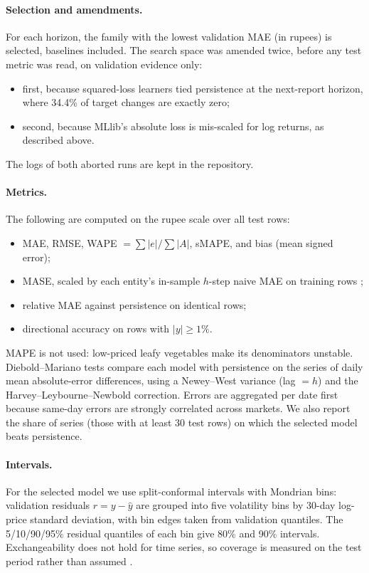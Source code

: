 \paragraph{Selection and amendments.}
For each horizon, the family with the lowest validation MAE (in rupees) is selected, baselines included.
The search space was amended twice, before any test metric was read, on validation evidence only:
\begin{itemize}
  \item first, because squared-loss learners tied persistence at the next-report horizon, where 34.4\% of target changes are exactly zero;
  \item second, because MLlib's absolute loss is mis-scaled for log returns, as described above.
\end{itemize}
The logs of both aborted runs are kept in the repository.

\paragraph{Metrics.}
The following are computed on the rupee scale over all test rows:
\begin{itemize}
  \item MAE, RMSE, WAPE $=\sum|e|/\sum|A|$, sMAPE, and bias (mean signed error);
  \item MASE, scaled by each entity's in-sample $h$-step naive MAE on training rows \cite{hyndman2006another};
  \item relative MAE against persistence on identical rows;
  \item directional accuracy on rows with $|y|\ge1\%$.
\end{itemize}
MAPE is not used: low-priced leafy vegetables make its denominators unstable.
Diebold--Mariano tests \cite{diebold1995comparing} compare each model with persistence on the series of daily mean absolute-error differences, using a Newey--West variance (lag $=h$) and the Harvey--Leybourne--Newbold correction.
Errors are aggregated per date first because same-day errors are strongly correlated across markets.
We also report the share of series (those with at least 30 test rows) on which the selected model beats persistence.

\paragraph{Intervals.}\label{sec:intervals}
For the selected model we use split-conformal intervals with Mondrian bins: validation residuals $r=y-\hat y$ are grouped into five volatility bins by 30-day log-price standard deviation, with bin edges taken from validation quantiles.
The 5/10/90/95\% residual quantiles of each bin give 80\% and 90\% intervals.
Exchangeability does not hold for time series, so coverage is measured on the test period rather than assumed \cite{gibbs2021adaptive,xu2023conformal}.

